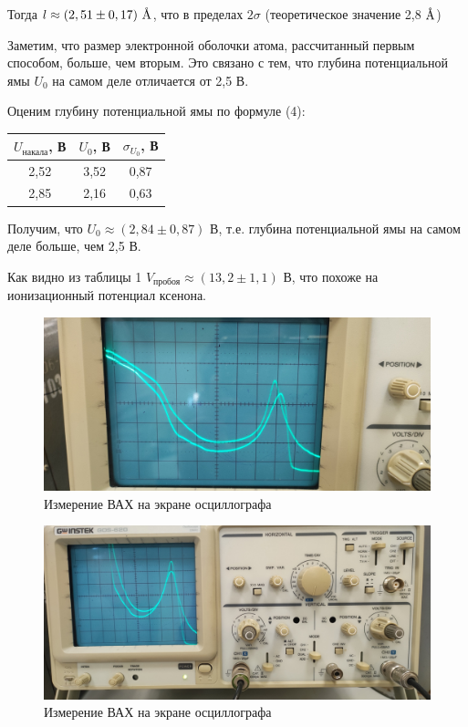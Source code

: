 \documentclass[a4paper,12pt]{report}
\begin{document}
Тогда $l \approx (2,51 \pm 0,17) \textup{~\AA}$, что в пределах $2\sigma$ (теоретическое значение 2,8$\textup{~\AA}$)

Заметим, что размер электронной оболочки атома, рассчитанный первым способом, больше, чем вторым. Это связано с тем, что глубина потенциальной ямы $U_0$ на самом деле отличается от 2,5 В.

Оценим глубину потенциальной ямы по формуле (4):

\begin{table}[H]
\begin{tabular}{|c|c|c|}
\hline
$U_{\text{накала}}$, В  & $U_0$, В & $\sigma_{U_0}$, В \\ \hline
2,52       & 3,52  & 0,87       \\ \hline
2,85       & 2,16  & 0,63       \\ \hline
\end{tabular}
\end{table}

Получим, что $U_0 \approx (2,84\pm 0,87)$ В, т.е. глубина потенциальной ямы на самом деле больше, чем 2,5 В.

Как видно из таблицы 1 $V_{\text{пробоя}}\approx (13,2 \pm 1,1)$ В, что похоже на ионизационный потенциал ксенона.

\begin{figure}[H]
    \centering
    \includegraphics[width=14cm]{pic1.jpg}
    \caption{Измерение ВАХ на экране осциллографа}
    \label{fig:vac}
\end{figure}
\begin{figure}[H]
    \centering
    \includegraphics[width=14cm]{pic2.jpg}
    \caption{Измерение ВАХ на экране осциллографа}
    \label{fig:vac}
\end{figure}
\end{document}
